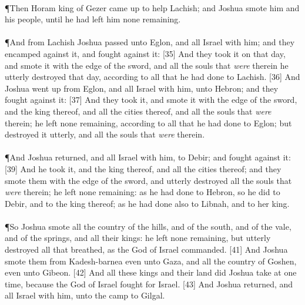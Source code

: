 \\
\P \textcolor[cmyk]{0.99998,1,0,0}{Then Horam king of Gezer came up to help Lachish; and Joshua smote him and his people, until he had left him none remaining.}\\
\\
\P \textcolor[cmyk]{0.99998,1,0,0}{And from Lachish Joshua passed unto Eglon, and all Israel with him; and they encamped against it, and fought against it:}
[35] \textcolor[cmyk]{0.99998,1,0,0}{And they took it on that day, and smote it with the edge of the sword, and all the souls that \emph{were} therein he utterly destroyed that day, according to all that he had done to Lachish.}
[36] \textcolor[cmyk]{0.99998,1,0,0}{And Joshua went up from Eglon, and all Israel with him, unto Hebron; and they fought against it:}
[37] \textcolor[cmyk]{0.99998,1,0,0}{And they took it, and smote it with the edge of the sword, and the king thereof, and all the cities thereof, and all the souls that \emph{were} therein; he left none remaining, according to all that he had done to Eglon; but destroyed it utterly, and all the souls that \emph{were} therein.}\\
\\
\P \textcolor[cmyk]{0.99998,1,0,0}{And Joshua returned, and all Israel with him, to Debir; and fought against it:}
[39] \textcolor[cmyk]{0.99998,1,0,0}{And he took it, and the king thereof, and all the cities thereof; and they smote them with the edge of the sword, and utterly destroyed all the souls that \emph{were} therein; he left none remaining: as he had done to Hebron, so he did to Debir, and to the king thereof; as he had done also to Libnah, and to her king.}\\
\\
\P \textcolor[cmyk]{0.99998,1,0,0}{So Joshua smote all the country of the hills, and of the south, and of the vale, and of the springs, and all their kings: he left none remaining, but utterly destroyed all that breathed, as the  God of Israel commanded.}
[41] \textcolor[cmyk]{0.99998,1,0,0}{And Joshua smote them from Kadesh-barnea even unto Gaza, and all the country of Goshen, even unto Gibeon.}
[42] \textcolor[cmyk]{0.99998,1,0,0}{And all these kings and their land did Joshua take at one time, because the  God of Israel fought for Israel.}
[43] \textcolor[cmyk]{0.99998,1,0,0}{And Joshua returned, and all Israel with him, unto the camp to Gilgal.}
